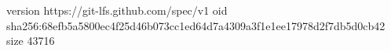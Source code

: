 version https://git-lfs.github.com/spec/v1
oid sha256:68efb5a5800ec4f25d46b073cc1ed64d7a4309a3f1e1ee17978d2f7db5d0cb42
size 43716
